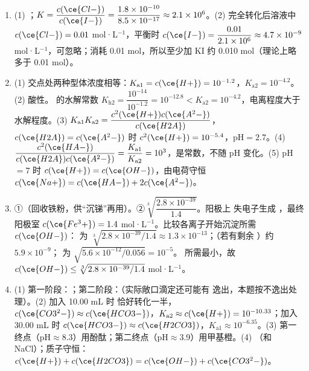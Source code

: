 \documentclass[UTF8,a4paper,zihao=5,oneside,openany,fontset=none]{ctexbook}
\newenvironment{jiexilist}{\small\begin{enumerate}[label={\textbf{\arabic*}.},leftmargin=1.6em,itemsep=0.3em,topsep=0.2em]}{\end{enumerate}}
\begin{document}
\begin{jiexilist}
\item (1) ；$K=\dfrac{c(\ce{Cl-})}{c(\ce{I-})}=\dfrac{1.8\times10^{-10}}{8.5\times10^{-17}}\approx2.1\times10^6$。(2) 完全转化后溶液中 $c(\ce{Cl-})=0.01$ mol·L$^{-1}$，平衡时 $c(\ce{I-})=\dfrac{0.01}{2.1\times10^6}\approx4.7\times10^{-9}$ mol·L$^{-1}$，可忽略；消耗  0.01 mol，所以至少加 KI 约 0.010 mol（理论上略多于 0.01 mol）。
\item (1) 交点处两种型体浓度相等：$K_{\text{a}1}=c(\ce{H+})=10^{-1.2}$，$K_{\text{a}2}=10^{-4.2}$。(2) 酸性。 的水解常数 $K_{\text{h}2}=\dfrac{10^{-14}}{10^{-1.2}}=10^{-12.8}<K_{\text{a}2}=10^{-4.2}$，电离程度大于水解程度。(3) $K_{\text{a}1}K_{\text{a}2}=\dfrac{c^2(\ce{H+})c(\ce{A^2-})}{c(\ce{H2A})}$，$c(\ce{H2A})=c(\ce{A^2-})$ 时 $c^2(\ce{H+})=10^{-5.4}$，pH$=2.7$。(4) $\dfrac{c^2(\ce{HA-})}{c(\ce{H2A})c(\ce{A^2-})}=\dfrac{K_{\text{a}1}}{K_{\text{a}2}}=10^{3}$，是常数，不随 pH 变化。(5) pH$=7$ 时 $c(\ce{H+})=c(\ce{OH-})$，由电荷守恒 $c(\ce{Na+})=c(\ce{HA-})+2c(\ce{A^2-})$。
\item ①（回收铁粉，供“沉锑”再用）。②$\sqrt[3]{\dfrac{2.8\times10^{-39}}{1.4}}$。阳极上  失电子生成 ，最终阳极室 $c(\ce{Fe^3+})=1.4$ mol·L$^{-1}$。比较各离子开始沉淀所需 $c(\ce{OH-})$： 为 $\sqrt[3]{2.8\times10^{-39}/1.4}\approx1.3\times10^{-13}$；（若有剩余 ）约 $5.9\times10^{-9}$； 为 $\sqrt{5.6\times10^{-12}/0.056}=10^{-5}$。 所需最小，故 $c(\ce{OH-})\le\sqrt[3]{2.8\times10^{-39}/1.4}$ mol·L$^{-1}$。
\item (1) 第一阶段：；第二阶段：（实际敞口滴定还可能有  逸出，本题按不逸出处理）。(2) 加入 10.00 mL 时  恰好转化一半，$c(\ce{CO3^2-})\approx c(\ce{HCO3-})$，$K_{\text{a}2}\approx c(\ce{H+})=10^{-10.33}$；加入 30.00 mL 时 $c(\ce{HCO3-})\approx c(\ce{H2CO3})$，$K_{\text{a}1}\approx10^{-6.35}$。(3) 第一终点（pH$\approx$8.3）用酚酞；第二终点（pH$\approx$3.9）用甲基橙。(4) （和 NaCl）；质子守恒：$c(\ce{H+})+c(\ce{H2CO3})=c(\ce{OH-})+c(\ce{CO3^2-})$。
\end{jiexilist}
\newcommand{\cfivebeaker}[4]{%
  \fill[mainblue!8] (#1,0) rectangle ++(#2,#4);
  \draw[thick] (#1,#3)--(#1,0)--++(#2,0)--++(0,#3);}
\newcommand{\cfivepower}[2]{%
  \draw[thick] (#1-0.12,#2-0.28)--(#1-0.12,#2+0.28); \draw[very thick] (#1+0.12,#2-0.15)--(#1+0.12,#2+0.15);
  \node[font=\scriptsize] at (#1-0.32,#2+0.3) {$+$}; \node[font=\scriptsize] at (#1+0.34,#2+0.3) {$-$};}
\end{document}
